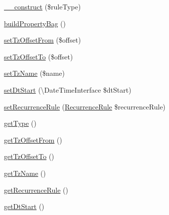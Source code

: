 \begin{DoxyCompactItemize}
\item 
\mbox{\hyperlink{class_eluceo_1_1i_cal_1_1_component_1_1_timezone_rule_af9ae541025f04809b70e8b2a31e0fa61}{\+\_\+\+\_\+construct}} (\$rule\+Type)
\item 
\mbox{\hyperlink{class_eluceo_1_1i_cal_1_1_component_1_1_timezone_rule_a35528a86b1fe5e3640d7964cfe46c201}{build\+Property\+Bag}} ()
\item 
\mbox{\hyperlink{class_eluceo_1_1i_cal_1_1_component_1_1_timezone_rule_adadbfa3ddbeda26f4e615eb07d467920}{set\+Tz\+Offset\+From}} (\$offset)
\item 
\mbox{\hyperlink{class_eluceo_1_1i_cal_1_1_component_1_1_timezone_rule_a7e32fa095725379eff54d1c66f9b1b69}{set\+Tz\+Offset\+To}} (\$offset)
\item 
\mbox{\hyperlink{class_eluceo_1_1i_cal_1_1_component_1_1_timezone_rule_ac8f0eac95662554ce52e247daf89952a}{set\+Tz\+Name}} (\$name)
\item 
\mbox{\hyperlink{class_eluceo_1_1i_cal_1_1_component_1_1_timezone_rule_a161d33d5128049a75e78280467ff9347}{set\+Dt\+Start}} (\textbackslash{}Date\+Time\+Interface \$dt\+Start)
\item 
\mbox{\hyperlink{class_eluceo_1_1i_cal_1_1_component_1_1_timezone_rule_aa74485780bd11e82c18720d6bba9b3b4}{set\+Recurrence\+Rule}} (\mbox{\hyperlink{class_eluceo_1_1i_cal_1_1_property_1_1_event_1_1_recurrence_rule}{Recurrence\+Rule}} \$recurrence\+Rule)
\item 
\mbox{\hyperlink{class_eluceo_1_1i_cal_1_1_component_1_1_timezone_rule_a8d7d4529c2b9d573d8dbe1ab86a3985e}{get\+Type}} ()
\item 
\mbox{\hyperlink{class_eluceo_1_1i_cal_1_1_component_1_1_timezone_rule_a808aa034effa5f37251fb844d2a6cd81}{get\+Tz\+Offset\+From}} ()
\item 
\mbox{\hyperlink{class_eluceo_1_1i_cal_1_1_component_1_1_timezone_rule_aafeda12e4329f3a87fd326546b184e3d}{get\+Tz\+Offset\+To}} ()
\item 
\mbox{\hyperlink{class_eluceo_1_1i_cal_1_1_component_1_1_timezone_rule_a2c832422bfc268aed12d7116ac65ca62}{get\+Tz\+Name}} ()
\item 
\mbox{\hyperlink{class_eluceo_1_1i_cal_1_1_component_1_1_timezone_rule_aa0a37d70f8cd2741dca701b150ecb4eb}{get\+Recurrence\+Rule}} ()
\item 
\mbox{\hyperlink{class_eluceo_1_1i_cal_1_1_component_1_1_timezone_rule_a1a574efdf94fc99192e26aa965293adb}{get\+Dt\+Start}} ()
\end{DoxyCompactItemize}
